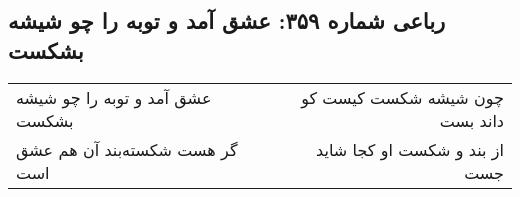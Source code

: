 \begin{center}
\section*{رباعی شماره ۳۵۹: عشق آمد و توبه را چو شیشه بشکست}
\label{sec:0359}
\begin{longtable}{l p{0.5cm} r}
عشق آمد و توبه را چو شیشه بشکست
&&
چون شیشه شکست کیست کو داند بست
\\
گر هست شکسته‌بند آن هم عشق است
&&
از بند و شکست او کجا شاید جست
\\
\end{longtable}
\end{center}
